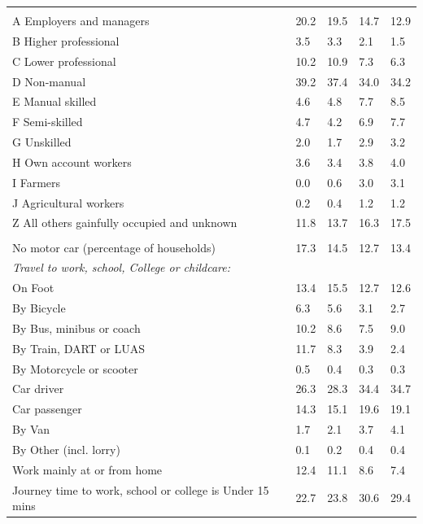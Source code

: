 \documentclass{article}
\begin{document}
\begin{table}[h]
\begin{tabular}{KTTTT}
\hline
    \\ 
    \hline
A Employers and managers & 20.2& 19.5& 14.7& 12.9\\
B Higher professional & 3.5& 3.3& 2.1& 1.5\\
C Lower professional & 10.2& 10.9&  7.3&  6.3\\
D Non-manual & 39.2& 37.4& 34.0& 34.2\\
E Manual skilled & 4.6& 4.8& 7.7& 8.5\\
F Semi-skilled & 4.7& 4.2& 6.9& 7.7\\
G Unskilled & 2.0& 1.7& 2.9& 3.2\\
H Own account workers & 3.6& 3.4& 3.8& 4.0\\
I Farmers & 0.0& 0.6& 3.0& 3.1\\
J Agricultural workers & 0.2& 0.4& 1.2& 1.2\\
Z All others gainfully occupied and unknown & 11.8& 13.7& 16.3& 17.5\\
\hline
{}\hline
    \\ 
    \hline
No motor car (percentage of households) & 17.3& 14.5& 12.7& 
13.4\\
    \hline 
\emph{Travel to work, school, College or childcare:} & & & \\
\quad On Foot & 13.4& 15.5& 12.7& 12.6\\ 
\quad By Bicycle & 6.3& 5.6& 3.1& 2.7\\ 
\quad By Bus, minibus or coach & 10.2&  8.6&  7.5&  9.0\\
\quad By Train, DART or LUAS & 11.7&  8.3&  3.9&  2.4\\
\quad By Motorcycle or scooter & 0.5& 0.4& 0.3& 0.3\\
\quad Car driver & 26.3 & 28.3& 34.4& 34.7\\
\quad Car passenger & 14.3& 15.1& 19.6& 19.1\\
\quad By Van & 1.7& 2.1& 3.7& 4.1\\
\quad By Other (incl. lorry) & 0.1& 0.2& 0.4& 0.4\\
    \hline
Work mainly at or from home & 12.4& 11.1&  8.6&  7.4\\
Journey time to work, school or college is Under 15 mins & 22.7& 23.8& 30.6& 29.4\\

\end{tabular}
\end{table}
\end{document}
